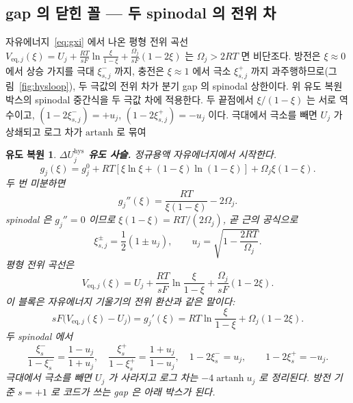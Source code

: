 \documentclass[11pt,a4paper]{article}
\newtheorem*{derivebox}{유도 복원}
\newcommand{\eq}{\mathrm{eq}}
\newcommand{\hys}{\mathrm{hys}}
\begin{document}
\subsection{gap 의 닫힌 꼴 — 두 spinodal 의 전위 차}
자유에너지~\eqref{eq:gxi} 에서 나온 평형 전위 곡선
$V_{\eq,j}(\xi)=U_j+\frac{RT}{sF}\ln\frac{\xi}{1-\xi}+\frac{\Omega_j}{sF}(1-2\xi)$ 는 $\Omega_j>2RT$ 면
비단조다. 방전은 $\xi\!\approx\!0$ 에서 상승 가지를 극대 $\xi_{s,j}^-$ 까지, 충전은 $\xi\!\approx\!1$ 에서 극소 $\xi_{s,j}^+$
까지 과주행하므로(그림~\ref{fig:hysloop}), 두 극값의 전위 차가 분기 gap 의 spinodal 상한이다.
위 유도 복원 박스의 spinodal 중간식을 두 극값 차에 적용한다. 두 끝점에서
$\xi/(1-\xi)$ 는 서로 역수이고, $(1-2\xi_{s,j}^-)=+u_j$, $(1-2\xi_{s,j}^+)=-u_j$ 이다. 극대에서 극소를 빼면 $U_j$ 가 상쇄되고 로그 차가 $\mathrm{artanh}$ 로 묶여

\begin{derivebox}
\textbf{$\Delta U_j^{\hys}$ 유도 사슬.} 정규용액 자유에너지에서 시작한다.
\begin{equation*}
g_j(\xi)=g_j^0+RT[\xi\ln\xi+(1-\xi)\ln(1-\xi)]+\Omega_j\xi(1-\xi).
\end{equation*}
두 번 미분하면
\begin{equation*}
g_j''(\xi)=\frac{RT}{\xi(1-\xi)}-2\Omega_j.
\end{equation*}
spinodal 은 $g_j''=0$ 이므로 $\xi(1-\xi)=RT/(2\Omega_j)$, 곧 근의 공식으로
\begin{equation*}
\xi_{s,j}^{\pm}=\frac12(1\pm u_j),\qquad u_j=\sqrt{1-\frac{2RT}{\Omega_j}}.
\end{equation*}
평형 전위 곡선은
\begin{equation}
V_{\eq,j}(\xi)=U_j+\frac{RT}{sF}\ln\frac{\xi}{1-\xi}+\frac{\Omega_j}{sF}(1-2\xi).
\label{eq:Veq}
\end{equation}
이 블록은 자유에너지 기울기의 전위 환산과 같은 말이다:
\begin{equation*}
sF\big(V_{\eq,j}(\xi)-U_j\big)=g_j'(\xi)
=RT\ln\frac{\xi}{1-\xi}+\Omega_j(1-2\xi).
\end{equation*}
두 spinodal 에서
\begin{equation*}
\frac{\xi_s^-}{1-\xi_s^-}=\frac{1-u_j}{1+u_j},\quad
\frac{\xi_s^+}{1-\xi_s^+}=\frac{1+u_j}{1-u_j},\quad
1-2\xi_s^-=u_j,\qquad 1-2\xi_s^+=-u_j.
\end{equation*}
극대에서 극소를 빼면 $U_j$ 가 사라지고 로그 차는 $-4\operatorname{artanh}u_j$ 로 정리된다. 방전 기준 $s=+1$ 로 코드가 쓰는 gap 은 아래 박스가 된다.
\end{derivebox}
\end{document}
